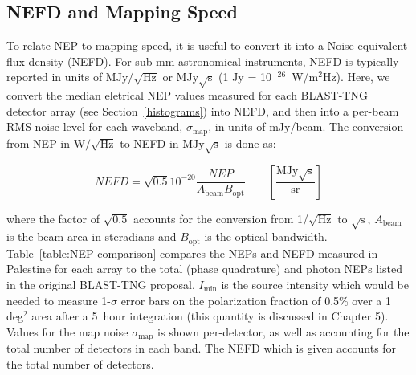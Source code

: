 \subsection{NEFD and Mapping Speed}\label{nefd}

To relate NEP to mapping speed, it is useful to convert it into a Noise-equivalent flux density (NEFD). For sub-mm astronomical instruments, NEFD is typically reported in units of $\mathrm{MJy}/\sqrt{\mathrm{Hz}}$ or $\mathrm{MJy}\sqrt{\mathrm{s}}$ (1 Jy = 10$^{-26}$~W/m$^{2}$Hz). Here, we convert the median eletrical NEP values measured for each BLAST-TNG detector array (see Section~\ref{histograms}) into NEFD, and then into a per-beam RMS noise level for each waveband, $\sigma_{\mathrm{map}}$, in units of mJy/beam. The conversion from NEP in $\mathrm{W}/\sqrt{\mathrm{Hz}}$ to NEFD in $\mathrm{MJy}\sqrt{\mathrm{s}}$ is done as:

\begin{equation}\label{eq:nep to nefd}
  NEFD = \sqrt{0.5} 10^{-20} \frac{NEP}{A_{\mathrm{beam}} B_{\mathrm{opt}}} \qquad \left[ \frac{\mathrm{MJy}\sqrt{\mathrm{s}}}{ \mathrm{sr} } \right]
\end{equation}

where the factor of $\sqrt{0.5}$ accounts for the conversion from 1/$\sqrt{\mathrm{Hz}}$ to $\sqrt{\mathrm{s}}$, $A_{\mathrm{beam}}$ is the beam area in steradians and $B_{\mathrm{opt}}$ is the optical bandwidth. Table~\ref{table:NEP comparison} compares the NEPs and NEFD measured in Palestine for each array to the total (phase quadrature) and photon NEPs listed in the original BLAST-TNG proposal. $I_{\mathrm{min}}$ is the source intensity which would be needed to measure 1-$\sigma$ error bars on the polarization fraction of 0.5\% over a 1 deg$^{2}$ area after a 5~hour integration (this quantity is discussed in Chapter 5). Values for the map noise $\sigma_{\mathrm{map}}$ is shown per-detector, as well as accounting for the total number of detectors in each band. The NEFD which is given accounts for the total number of detectors.

